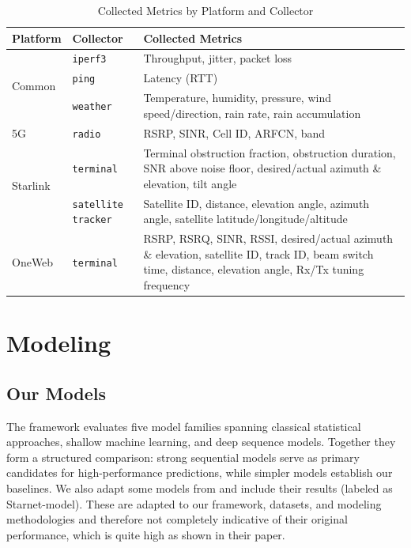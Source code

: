\documentclass[12pt]{article}
\begin{document}
\begin{table}[t]
\centering
\caption{Collected Metrics by Platform and Collector}
\label{tab:metrics}
\renewcommand{\arraystretch}{1.2}
\setlength{\tabcolsep}{5pt}

\begin{tabular}{p{2.2cm} p{2.5cm} p{10.8cm}}
\toprule
\textbf{Platform} & \textbf{Collector} & \textbf{Collected Metrics} \\
\midrule

\multirow{3}{*}{Common}
& \texttt{iperf3}
& Throughput, jitter, packet loss \\

& \texttt{ping}
& Latency (RTT) \\

& \texttt{weather}
& Temperature, humidity, pressure, wind speed/direction, rain rate, rain accumulation \\

\midrule

\multirow{1}{*}{5G}
& \texttt{radio}
& RSRP, SINR, Cell ID, ARFCN, band \\

\midrule

\multirow{2}{*}{Starlink}
& \texttt{terminal}
& Terminal obstruction fraction, obstruction duration, SNR above noise floor, desired/actual azimuth \& elevation, tilt angle \\

& \texttt{satellite tracker}
& Satellite ID, distance, elevation angle, azimuth angle, satellite latitude/longitude/altitude \\

\midrule

\multirow{2}{*}{OneWeb}
& \texttt{terminal}
& RSRP, RSRQ, SINR, RSSI, desired/actual azimuth \& elevation, satellite ID, track ID, beam switch time, distance, elevation angle, Rx/Tx tuning frequency \\

\bottomrule
\end{tabular}

\end{table}

\section{Modeling}

\subsection{Our Models}
The framework evaluates five model families spanning classical statistical approaches, shallow machine learning, and deep sequence models. Together they form a structured comparison: strong sequential models serve as primary candidates for high-performance predictions, while simpler models establish our baselines. We also adapt some models from \cite{liu2025vivisecting} and include their results (labeled as Starnet-model). These are adapted to our framework, datasets, and modeling methodologies and therefore not completely indicative of their original performance, which is quite high as shown in their paper.
\end{document}
